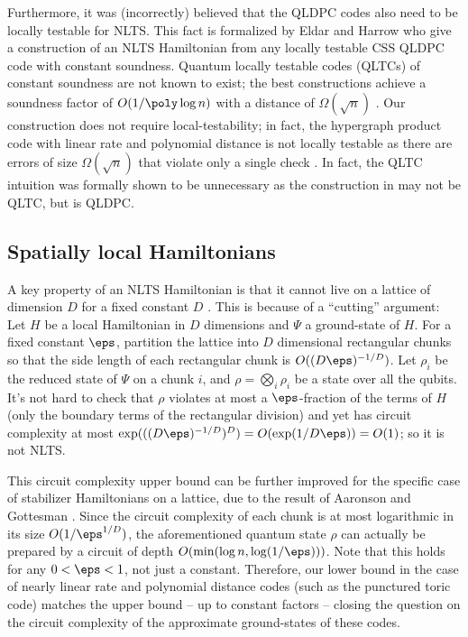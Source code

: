 \documentclass[11pt]{article}
\begin{document}
%
Furthermore, it was (incorrectly) believed that the QLDPC codes also need to be
locally testable  %
\cite{doi:10.1137/140975498} for NLTS. This fact is formalized by Eldar and Harrow \cite{8104078} who give a construction of an NLTS Hamiltonian from any
locally testable %
CSS QLDPC code with constant soundness. Quantum locally testable codes (QLTCs) of constant soundness are not known to exist; the best constructions achieve a soundness factor of $O(1/\poly \log n)$  with a distance of $\Omega(\sqrt{n})$ \cite{hastings17,1911.03069}. Our construction does not require local-testability; in fact, the hypergraph product code \cite{5205648} with linear rate and polynomial distance is not 
locally testable %
as there are errors of size $\Omega(\sqrt{n})$ that violate only a single check \cite[page 4]{1911.03069}. In fact, the QLTC intuition was formally shown to be unnecessary as the construction in \cite{nlts-proof} may not be QLTC, but is QLDPC.

\subsection{Spatially local Hamiltonians}
A key property of an NLTS Hamiltonian is that it cannot live on a lattice of dimension $D$ for a fixed constant $D$ \cite{10.1145/2491533.2491549}. This is because of a ``cutting'' argument: Let $H$ be a local Hamiltonian in $D$ dimensions and $\Psi$ a ground-state of $H$.
For a fixed constant $\eps$, partition the lattice into $D$ dimensional rectangular chunks so that the side length of each rectangular chunk is $O((D\eps)^{-1/D})$. Let $\rho_i$ be the reduced state of $\Psi$ on a chunk $i$, and $\rho = \bigotimes_i \rho_i$ be a state over all the qubits. It's not hard to check that $\rho$ violates at most a $\eps$-fraction of the terms of $H$ (only the boundary terms of the rectangular division) and yet has circuit complexity at most $\exp(((D \eps)^{-1/D} )^{D}) = O(\exp(1/D\eps)) = O(1)$; so it is not NLTS. 

This circuit complexity upper bound can be further improved for the specific case of stabilizer Hamiltonians on a lattice, due to the result of Aaronson and Gottesman \cite{PhysRevA.70.052328}. Since the circuit complexity of each chunk is at most logarithmic in its size $O(1/\eps^{1/D})$, the aforementioned quantum state $\rho$ can actually be prepared by a circuit of depth $O(\min (\log n, \log(1/\eps)))$. Note that this holds for any $0<\eps < 1$, not just a constant. Therefore, our lower bound in the case of nearly linear rate and polynomial distance codes (such as the punctured toric code) matches the upper bound -- up to constant factors -- closing the question on the circuit complexity of the approximate ground-states of these codes.
\end{document}
